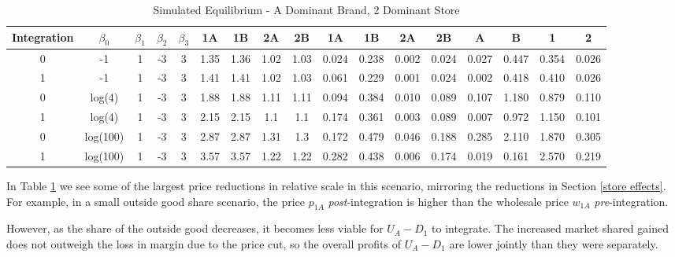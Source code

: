 \documentclass[12pt]{article}%
\begin{document}
\begin{table}[h]
{\begin{tabular}{c|cccc|cccc|cccc|cccc}
    \midrule
    \multicolumn{1}{c|}{Integration} & \multicolumn{1}{c}{$\beta_0$} & \multicolumn{1}{c}{$\beta_1$} & \multicolumn{1}{c}{$\beta_2$} & \multicolumn{1}{c|}{$\beta_3$} & \multicolumn{1}{c}{1A} & \multicolumn{1}{c}{1B} & \multicolumn{1}{c}{2A} & \multicolumn{1}{c|}{2B} & \multicolumn{1}{c}{1A} & \multicolumn{1}{c}{1B} & \multicolumn{1}{c}{2A} & \multicolumn{1}{c|}{2B} & \multicolumn{1}{c}{A} & \multicolumn{1}{c}{B} & \multicolumn{1}{c}{1} & \multicolumn{1}{c}{2} \\
    \midrule
    \midrule
    0     & -1    & 1     & -3    & 3     & 1.35  & 1.36  & 1.02  & 1.03  & 0.024 & 0.238 & 0.002 & 0.024 & 0.027 & 0.447 & 0.354 & 0.026 \\
    1     & -1    & 1     & -3    & 3     & 1.41  & 1.41  & 1.02  & 1.03  & 0.061 & 0.229 & 0.001 & 0.024 & 0.002 & 0.418 & 0.410 & 0.026 \\
    0     & log(4) & 1     & -3    & 3     & 1.88  & 1.88  & 1.11  & 1.11  & 0.094 & 0.384 & 0.010 & 0.089 & 0.107 & 1.180 & 0.879 & 0.110 \\
    1     & log(4) & 1     & -3    & 3     & 2.15  & 2.15  & 1.1   & 1.1   & 0.174 & 0.361 & 0.003 & 0.089 & 0.007 & 0.972 & 1.150 & 0.101 \\
    0     & log(100) & 1     & -3    & 3     & 2.87  & 2.87  & 1.31  & 1.3   & 0.172 & 0.479 & 0.046 & 0.188 & 0.285 & 2.110 & 1.870 & 0.305 \\
    1     & log(100) & 1     & -3    & 3     & 3.57  & 3.57  & 1.22  & 1.22  & 0.282 & 0.438 & 0.006 & 0.174 & 0.019 & 0.161 & 2.570 & 0.219 \\



    \end{tabular}%
    }
    \caption{Simulated Equilibrium - A Dominant Brand, 2 Dominant Store}
  \label{tab:store effects - A, 2 dom}%
\end{table}%

In Table \ref{tab:store effects - A, 2 dom} we see some of the largest price reductions in relative scale in this scenario, mirroring the reductions in Section \ref{store effects}. For example, in a small outside good share scenario, the price $p_{1A}$ \textit{post}-integration is higher than the wholesale price $w_{1A}$ \textit{pre}-integration. 

However, as the share of the outside good decreases, it becomes less viable for $U_A-D_1$ to integrate. The increased market shared gained does not outweigh the loss in margin due to the price cut, so the overall profits of $U_A-D_1$ are lower jointly than they were separately. 
\end{document}
